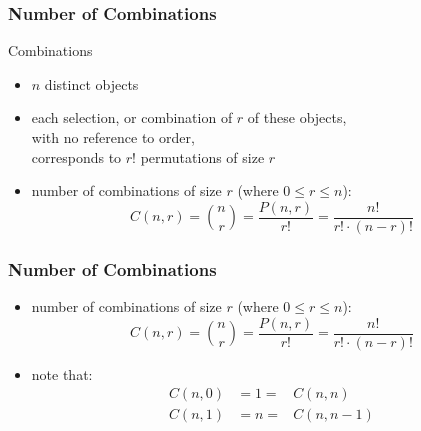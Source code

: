 \documentclass[dvipsnames]{beamer}
\begin{document}
\begin{frame}
  \frametitle{Number of Combinations}

  \begin{block}{Combinations}
    \begin{itemize}
      \item $n$ distinct objects
      \item each selection, or \alert{combination} of $r$ of these objects,\\
        with no reference to order,\\
        corresponds to $r!$ permutations of size $r$

      \pause
      \medskip
      \item number of combinations of size $r$ (where $0 \leq r \leq n$):
      \begin{equation*}
        C(n,r) = {n \choose r} = \frac{P(n,r)}{r!} = \frac{n!}{r! \cdot (n-r)!}
      \end{equation*}
    \end{itemize}
  \end{block}
\end{frame}

\begin{frame}
  \frametitle{Number of Combinations}

  \begin{itemize}
    \item number of combinations of size $r$ (where $0 \leq r \leq n$):
    \begin{equation*}
      C(n,r) = {n \choose r} = \frac{P(n,r)}{r!} = \frac{n!}{r! \cdot (n-r)!}
    \end{equation*}

    \item note that:
    \begin{eqnarray*}
      C(n,0) & = 1 = & C(n,n)\\
      C(n,1) & = n = & C(n,n-1)
    \end{eqnarray*}
  \end{itemize}
\end{frame}
\end{document}
